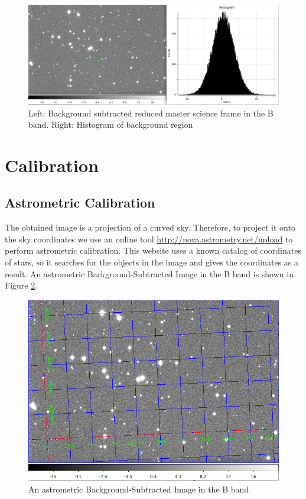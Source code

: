 \documentclass[12pt]{article}
\begin{document}
\begin{figure}[H]
    \centering
    \includegraphics[width=\textwidth]{fig/backsub_B.png}
    \caption{Left: Background subtracted reduced master science frame in the B band. Right: Histogram of background region}
    \label{background}
\end{figure}


\section{Calibration}
\subsection{Astrometric Calibration}
The obtained image is a projection of a curved sky. Therefore, to project it onto the sky coordinates we use an online tool \url{http://nova.astrometry.net/upload} to perform astrometric calibration. This website uses a known catalog of coordinates of stars, so it searches for the objects in the image and gives the coordinates as a result. An astrometric Background-Subtracted Image in the B band is shown in Figure \ref{astrometry}. 

\begin{figure}[H]
    \centering
    \includegraphics[width=\textwidth]{fig/Astrometric_Calibration_B.png}
    \caption{An astrometric Background-Subtracted Image in the B band}
    \label{astrometry}
\end{figure}
\end{document}
